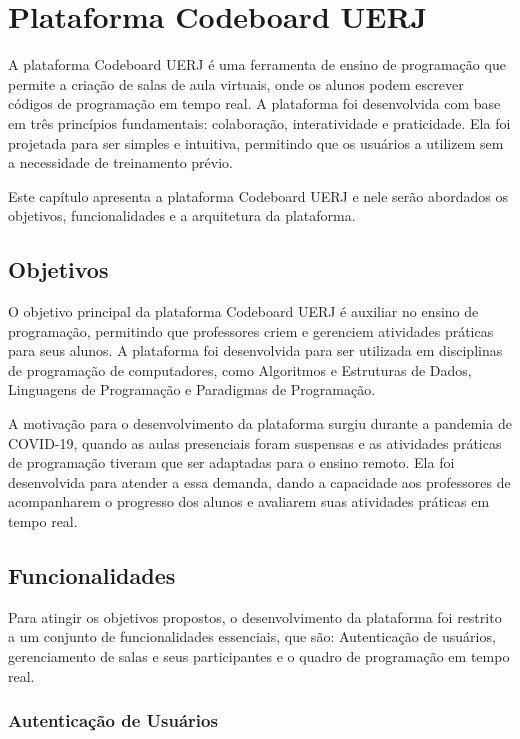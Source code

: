 \section{Plataforma Codeboard UERJ}

A plataforma Codeboard UERJ é uma ferramenta de ensino de programação que permite a criação de salas de aula virtuais, onde os alunos podem escrever códigos de programação em tempo real. A plataforma foi desenvolvida com base em três princípios fundamentais: colaboração, interatividade e praticidade. Ela foi projetada para ser simples e intuitiva, permitindo que os usuários a utilizem sem a necessidade de treinamento prévio. 

Este capítulo apresenta a plataforma Codeboard UERJ e nele serão abordados os objetivos, funcionalidades e a arquitetura da plataforma.	

\subsection{Objetivos}

O objetivo principal da plataforma Codeboard UERJ é auxiliar no ensino de programação, permitindo que professores criem e gerenciem atividades práticas para seus alunos. A plataforma foi desenvolvida para ser utilizada em disciplinas de programação de computadores, como Algoritmos e Estruturas de Dados, Linguagens de Programação e Paradigmas de Programação.

A motivação para o desenvolvimento da plataforma surgiu durante a pandemia de COVID-19, quando as aulas presenciais foram suspensas e as atividades práticas de programação tiveram que ser adaptadas para o ensino remoto. Ela foi desenvolvida para atender a essa demanda, dando a capacidade aos professores de acompanharem o progresso dos alunos e avaliarem suas atividades práticas em tempo real.


\subsection{Funcionalidades}

Para atingir os objetivos propostos, o desenvolvimento da plataforma foi restrito a um conjunto de funcionalidades essenciais, que são:
Autenticação de usuários, gerenciamento de salas e seus participantes e o quadro de programação em tempo real.

\subsubsection{Autenticação de Usuários}

